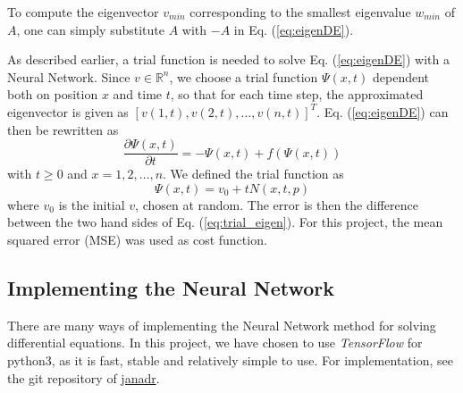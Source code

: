 To compute the eigenvector $v_{min}$ corresponding to the smallest eigenvalue $w_{min}$ of $A$, one can simply substitute $A$ with $-A$ in Eq. (\ref{eq:eigenDE}).

As described earlier, a trial function is needed to solve Eq. (\ref{eq:eigenDE}) with a Neural Network. Since $v \in \mathbb{R}^n$, we choose a trial function $\Psi(x,t)$ dependent both on position $x$ and time $t$, so that for each time step, the approximated eigenvector is given as $[v(1,t), v(2,t), \ldots, v(n,t)]^T$. Eq. (\ref{eq:eigenDE}) can then be rewritten as
\begin{equation}\label{eq:trial_eigen}
	\frac{\partial \Psi(x,t)}{\partial t} = -\Psi(x,t) + f(\Psi(x,t))
\end{equation}
with $t \geq 0$ and $x=1,2,\ldots,n$. We defined the trial function as 
\begin{equation*}
	 \Psi(x,t) = v_0 + tN(x,t,p)
\end{equation*}
where $v_0$ is the initial $v$, chosen at random.   
The error is then the difference between the two hand sides of Eq. (\ref{eq:trial_eigen}). For this project, the mean squared error (MSE) was used as cost function. 

\subsection{Implementing the Neural Network}
There are many ways of implementing the Neural Network method for solving differential equations. In this project, we have chosen to use \textit{TensorFlow} for python3, as it is fast, stable and relatively simple to use. For implementation, see the git repository of \href{https://github.com/janadr/FYS-STK4155/tree/master/project3/code}{janadr}.
